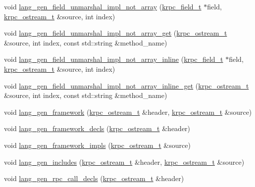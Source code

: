 \begin{DoxyCompactItemize}
\item 
void \hyperlink{classkrpc__gen__cpp__t_a2343d39ad24808e563030b42b124c26c}{lang\+\_\+gen\+\_\+field\+\_\+unmarshal\+\_\+impl\+\_\+not\+\_\+array} (\hyperlink{classkrpc__field__t}{krpc\+\_\+field\+\_\+t} $\ast$field, \hyperlink{classkrpc__ostream__t}{krpc\+\_\+ostream\+\_\+t} \&source, int index)
\item 
void \hyperlink{classkrpc__gen__cpp__t_a900b91e1bc0add8441ec590b73e5efe8}{lang\+\_\+gen\+\_\+field\+\_\+unmarshal\+\_\+impl\+\_\+not\+\_\+array\+\_\+get} (\hyperlink{classkrpc__ostream__t}{krpc\+\_\+ostream\+\_\+t} \&source, int index, const std\+::string \&method\+\_\+name)
\item 
void \hyperlink{classkrpc__gen__cpp__t_afe730533fde921778f3cf1fbd280acec}{lang\+\_\+gen\+\_\+field\+\_\+unmarshal\+\_\+impl\+\_\+not\+\_\+array\+\_\+inline} (\hyperlink{classkrpc__field__t}{krpc\+\_\+field\+\_\+t} $\ast$field, \hyperlink{classkrpc__ostream__t}{krpc\+\_\+ostream\+\_\+t} \&source, int index)
\item 
void \hyperlink{classkrpc__gen__cpp__t_aea99175263b535455128cd91d54c8806}{lang\+\_\+gen\+\_\+field\+\_\+unmarshal\+\_\+impl\+\_\+not\+\_\+array\+\_\+inline\+\_\+get} (\hyperlink{classkrpc__ostream__t}{krpc\+\_\+ostream\+\_\+t} \&source, int index, const std\+::string \&method\+\_\+name)
\item 
void \hyperlink{classkrpc__gen__cpp__t_a0cd966ba122e2c4e0808330f1683ac39}{lang\+\_\+gen\+\_\+framework} (\hyperlink{classkrpc__ostream__t}{krpc\+\_\+ostream\+\_\+t} \&header, \hyperlink{classkrpc__ostream__t}{krpc\+\_\+ostream\+\_\+t} \&source)
\item 
void \hyperlink{classkrpc__gen__cpp__t_a5c9bee0ba9d9250a6d8b6850bf307e78}{lang\+\_\+gen\+\_\+framework\+\_\+decls} (\hyperlink{classkrpc__ostream__t}{krpc\+\_\+ostream\+\_\+t} \&header)
\item 
void \hyperlink{classkrpc__gen__cpp__t_a165347fc5b13d7f6bb4b9bbdd6c3d1da}{lang\+\_\+gen\+\_\+framework\+\_\+impls} (\hyperlink{classkrpc__ostream__t}{krpc\+\_\+ostream\+\_\+t} \&source)
\item 
void \hyperlink{classkrpc__gen__cpp__t_a8ab7f486519de0cb6ff6850efa3a23d2}{lang\+\_\+gen\+\_\+includes} (\hyperlink{classkrpc__ostream__t}{krpc\+\_\+ostream\+\_\+t} \&header, \hyperlink{classkrpc__ostream__t}{krpc\+\_\+ostream\+\_\+t} \&source)
\item 
void \hyperlink{classkrpc__gen__cpp__t_a62a167f5b5900e4ff80788499d0bbd51}{lang\+\_\+gen\+\_\+rpc\+\_\+call\+\_\+decls} (\hyperlink{classkrpc__ostream__t}{krpc\+\_\+ostream\+\_\+t} \&header)

\end{DoxyCompactItemize}
